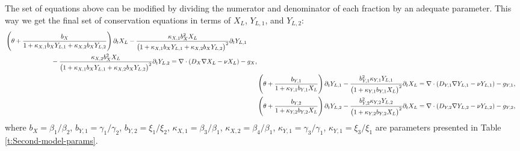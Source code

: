\documentclass[11pt]{article}
\numberwithin{equation}{section}
\begin{document}
The set of equations above can be modified by dividing the numerator and denominator of each fraction by an adequate parameter. This way we get the final set of conservation equations in terms of $X_L$, $Y_{L,1}$, and $Y_{L,2}$:
\begin{subequations}
\label{eq:extendedsys}
\begin{align}
	\begin{split} 
		&\left( \theta + \frac{b_X}{1 + \kappa_{X,1} b_{X} Y_{L,1} + \kappa_{X,2} b_{X} Y_{L,2}} \right)
		\partial_t X_L - 
		\frac{\kappa_{X,1} b_X^2 X_L}{\big(1 + \kappa_{X,1} b_{X} Y_{L,1} + \kappa_{X,2} b_{X} Y_{L,2} \big)^2} \partial_t Y_{L,1}
		\\
		&\hspace{2.5cm} -
		\frac{\kappa_{X,2} b_X^2 X_L}{\big(1 + \kappa_{X,1} b_{X} Y_{L,1} + \kappa_{X,2} b_{X} Y_{L,2} \big)^2} \partial_t Y_{L,2}
		= \nabla \cdot(D_X \nabla X_L - \nu X_L) - g_X, 
	\end{split} \label{eq:generalised-x_t}
	\\
	&\left(\theta + \frac{b_{Y,1}}{1 + \kappa_{Y,1} b_{Y,1} X_L}\right) \partial_t Y_{L,1}
	- 
	\frac{b_{Y,1}^2 \kappa_{Y,1} Y_{L,1}}{\big(1 + \kappa_{Y,1} b_{Y,1} X_L\big)^2} \partial_t X_L 
	= \nabla \cdot(D_{Y,1} \nabla Y_{L,1} - \nu Y_{L,1}) - g_{Y,1}, \label{eq:generalised-y_1_t}
	\\
	&\left(\theta + \frac{b_{Y,2}}{1 + \kappa_{Y,2} b_{Y,2} X_L}\right) \partial_t Y_{L,2} - \frac{ b_{Y,2}^2 \kappa_{Y,2} Y_{L,2}}{\big(1 + \kappa_{Y,2} b_{Y,2} X_L\big)^2} \partial_t X_L
	= \nabla \cdot(D_{Y,2} \nabla Y_{L,2} - \nu Y_{L,2}) - g_{Y,2}, \label{eq:generalised-y_2_t}
\end{align}
\end{subequations}
where $b_X = \beta_1 / \beta_2$, $b_{Y,1} = \gamma_1 / \gamma_2$, $b_{Y,2} = \xi_1 / \xi_2$, $\kappa_{X,1} = \beta_3 / \beta_1$, $\kappa_{X,2} = \beta_4 / \beta_1$, $\kappa_{Y,1} = \gamma_3 / \gamma_1$, $\kappa_{Y,1} = \xi_3 / \xi_1$ are parameters presented in Table \ref{t:Second-model-params}.
	
\end{document}
